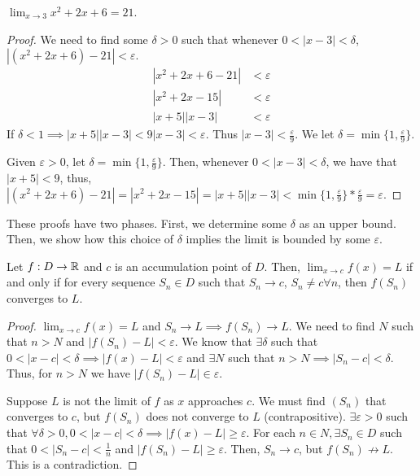 \begin{theorem}{}{}
    $\lim_{x \to 3} x^2 + 2x + 6 = 21$.
\end{theorem}
\begin{proof}
    We need to find some $\delta > 0$ such that whenever $0 < |x - 3| < \delta$, $|(x^2 + 2x + 6) - 21| < \varepsilon$.
    \begin{align*}
        |x^2 + 2x + 6 - 21| &< \varepsilon \\
        |x^2 + 2x - 15| &< \varepsilon \\
        |x + 5||x - 3| &< \varepsilon
    \end{align*}
    If $\delta < 1 \implies |x + 5||x - 3| < 9|x - 3| < \varepsilon$. Thus $|x - 3| < \frac{\varepsilon}{9}$. We let $\delta = \min\{1, \frac{\varepsilon}{9}\}$.

    Given $\varepsilon > 0$, let $\delta = \min\{1, \frac{\varepsilon}{9}\}$. Then, whenever $0 < |x - 3| < \delta$, we have that $|x + 5| < 9$, thus, $|(x^2 + 2x + 6) - 21| = |x^2 + 2x - 15| = |x + 5||x - 3| < \min\{1, \frac{\varepsilon}{9}\} * \frac{\varepsilon}{9} = \varepsilon$.
\end{proof}
\begin{note}
    These proofs have two phases. First, we determine some $\delta$ as an upper bound. Then, we show how this choice of $\delta$ implies the limit is bounded by some $\varepsilon$.
\end{note}

\begin{theorem}{}{}
    Let $f:D \to \mathbb{R}$ and $c$ is an accumulation point of $D$. Then, $\lim_{x \to c} f(x) = L$ if and only if for every sequence $S_n \in D$ such that $S_n \to c$, $S_n \neq c \forall n$, then $f(S_n)$ converges to $L$.
\end{theorem}
\begin{proof}
    $\lim_{x \to c} f(x) = L$ and $S_n \to L \implies f(S_n) \to L$. We need to find $N$ such that $n > N$ and $|f(S_n) - L| < \varepsilon$. We know that $\exists \delta$ such that $0 < |x - c| < \delta \implies |f(x) - L| < \varepsilon$ and $\exists N$ such that $n > N \implies |S_n - c| < \delta$. Thus, for $n > N$ we have $|f(S_n) - L| \in \varepsilon$.

    Suppose $L$ is not the limit of $f$ as $x$ approaches $c$. We must find $(S_n)$ that converges to $c$, but $f(S_n)$ does not converge to $L$ (contrapositive). $\exists \varepsilon > 0$ such that $\forall \delta > 0, 0 < |x - c| < \delta \implies |f(x) - L| \geq \varepsilon$. For each $n \in N, \exists S_n \in D$ such that $0 < |S_n - c| < \frac{1}{n}$ and $|f(S_n) - L| \geq \varepsilon$. Then, $S_n \to c$, but $f(S_n) \not\to L$. This is a contradiction.
\end{proof}